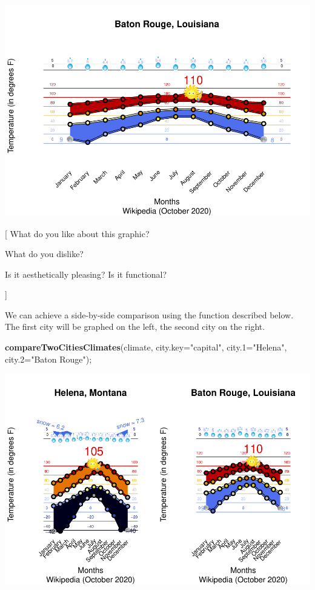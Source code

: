 \documentclass[
]{article}
\newenvironment{Shaded}{\begin{snugshade}}{\end{snugshade}}
\newcommand{\DataTypeTok}[1]{\textcolor[rgb]{0.13,0.29,0.53}{#1}}
\newcommand{\KeywordTok}[1]{\textcolor[rgb]{0.13,0.29,0.53}{\textbf{#1}}}
\newcommand{\NormalTok}[1]{#1}
\newcommand{\StringTok}[1]{\textcolor[rgb]{0.31,0.60,0.02}{#1}}
\begin{document}
\includegraphics{graphics/chunk-hclust-climate-one-research-graph-2.pdf}

{[} What do you like about this graphic?

What do you dislike?

Is it aesthetically pleasing? Is it functional?

{]}

We can achieve a side-by-side comparison using the function described
below. The first city will be graphed on the left, the second city on
the right.

\begin{Shaded}
\begin{Highlighting}[]
\KeywordTok{compareTwoCitiesClimates}\NormalTok{(climate, }\DataTypeTok{city.key=}\StringTok{"capital"}\NormalTok{, }\DataTypeTok{city.1=}\StringTok{"Helena"}\NormalTok{, }\DataTypeTok{city.2=}\StringTok{"Baton Rouge"}\NormalTok{);}
\end{Highlighting}
\end{Shaded}

\includegraphics{graphics/chunk-hclust-climate-one-research-graph-comparison-1.pdf}
\end{document}
